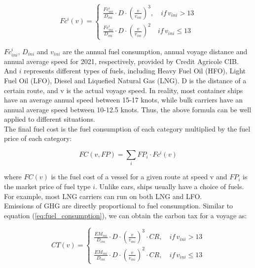 \documentclass[a4paper,12pt]{article}
\begin{document}
\begin{equation}
	\label{eq:fuel_consumption}
	Fc^i(v) =
	\left\{
	\begin{aligned}
		\frac{Fc^i_{ini}}{D_{ini}} \cdot D \cdot (\frac{v}{v_{ini}})^3, \quad if \, v_{ini} > 13 \\
		\frac{Fc^i_{ini}}{D_{ini}} \cdot D \cdot (\frac{v}{v_{ini}})^2 \quad if \, v_{ini} \leq 13
	\end{aligned}
	\right.
\end{equation}

$Fc^i_{ini}$, $D_{ini}$ and $v_{ini}$ are the annual fuel consumption, annual voyage distance and annual average speed for 2021, respectively, provided by Credit Agricole CIB.
And $i$ represents different types of fuels, including Heavy Fuel Oil (HFO), Light Fuel Oil (LFO), Diesel and Liquefied Natural Gas (LNG). D is the distance of a certain route, and v is the actual voyage speed.
In reality, most container ships have an average annual speed between 15-17 knots, while bulk carriers have an annual average speed between 10-12.5 knots.
Thus, the above formula can be well applied to different situations.\\

The final fuel cost is the fuel consumption of each category multiplied by the fuel price of each category:

\begin{equation}
	\label{eq:fuel_cost}
	FC(v, FP) = \sum_i FP_i \cdot Fc^i(v)
\end{equation}

where $FC(v)$ is the fuel cost of a vessel for a given route at speed v and $FP_i$ is the market price of fuel type $i$. Unlike cars, ships usually have a choice of fuels. For example, most LNG carriers can run on both LNG and LFO.\\

Emissions of GHG are directly proportional to fuel consumption.
Similar to equation (\ref{eq:fuel_consumption}), we can obtain the carbon tax for a voyage as:

\begin{equation}
	\label{eq:emission}
	CT(v) =
	\left\{
	\begin{aligned}
		\frac{EM_{ini}}{D_{ini}} \cdot D \cdot (\frac{v}{v_{ini}})^3 \cdot CR, \quad if \, v_{ini} > 13 \\
		\frac{EM_{ini}}{D_{ini}} \cdot D \cdot (\frac{v}{v_{ini}})^2 \cdot CR, \quad if \, v_{ini} \leq 13
	\end{aligned}
	\right.
\end{equation}
\end{document}
